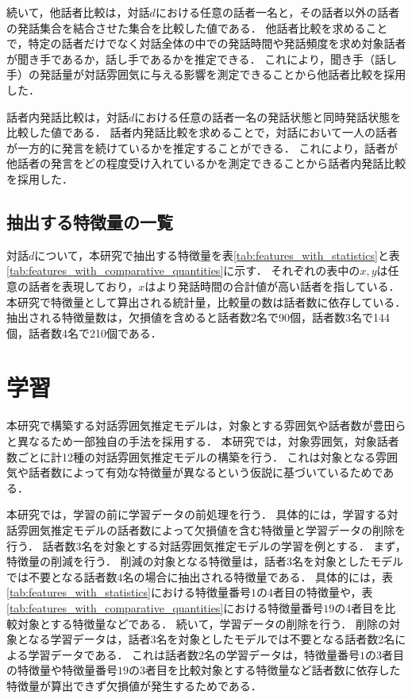 続いて，他話者比較は，対話$d$における任意の話者一名と，その話者以外の話者の発話集合を結合させた集合を比較した値である．
他話者比較を求めることで，特定の話者だけでなく対話全体の中での発話時間や発話頻度を求め対象話者が聞き手であるか，話し手であるかを推定できる．
これにより，聞き手（話し手）の発話量が対話雰囲気に与える影響を測定できることから他話者比較を採用した．

話者内発話比較は，対話$d$における任意の話者一名の発話状態と同時発話状態を比較した値である．
話者内発話比較を求めることで，対話において一人の話者が一方的に発言を続けているかを推定することができる．
これにより，話者が他話者の発言をどの程度受け入れているかを測定できることから話者内発話比較を採用した．

\subsection{抽出する特徴量の一覧}

対話$d$について，本研究で抽出する特徴量を表\ref{tab:features_with_statistics}と表\ref{tab:features_with_comparative_quantities}に示す．
それぞれの表中の$x, y$は任意の話者を表現しており，$x$はより発話時間の合計値が高い話者を指している．
本研究で特徴量として算出される統計量，比較量の数は話者数に依存している．
抽出される特徴量数は，欠損値を含めると話者数2名で90個，話者数3名で144個，話者数4名で210個である．




\section{学習\label{node:machine_learning}}

本研究で構築する対話雰囲気推定モデルは，対象とする雰囲気や話者数が豊田らと異なるため一部独自の手法を採用する．
本研究では，対象雰囲気，対象話者数ごとに計12種の対話雰囲気推定モデルの構築を行う．
これは対象となる雰囲気や話者数によって有効な特徴量が異なるという仮説に基づいているためである．

本研究では，学習の前に学習データの前処理を行う．
具体的には，学習する対話雰囲気推定モデルの話者数によって欠損値を含む特徴量と学習データの削除を行う．
話者数3名を対象とする対話雰囲気推定モデルの学習を例とする．
まず，特徴量の削減を行う．
削減の対象となる特徴量は，話者3名を対象としたモデルでは不要となる話者数4名の場合に抽出される特徴量である．
具体的には，表\ref{tab:features_with_statistics}における特徴量番号$1$の4者目の特徴量や，表\ref{tab:features_with_comparative_quantities}における特徴量番号$19$の4者目を比較対象とする特徴量などである．
続いて，学習データの削除を行う．
削除の対象となる学習データは，話者3名を対象としたモデルでは不要となる話者数2名による学習データである．
これは話者数2名の学習データは，特徴量番号$1$の3者目の特徴量や特徴量番号$19$の3者目を比較対象とする特徴量など話者数に依存した特徴量が算出できず欠損値が発生するためである．


